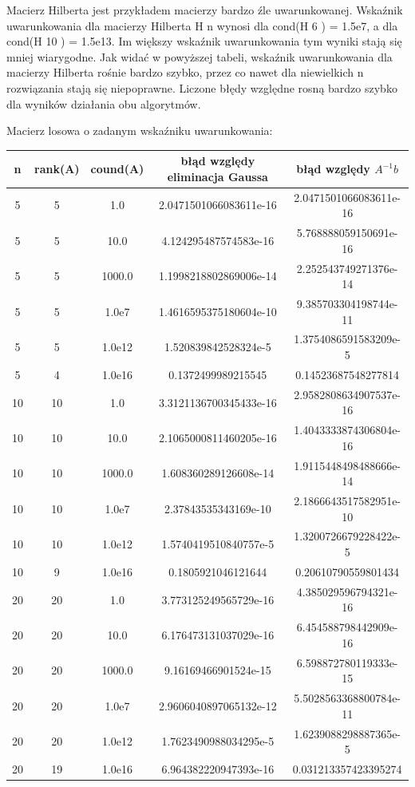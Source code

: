 \documentclass[8pt,letterpaper]{article}
\begin{document}
\hspace{1.0 cm}Macierz Hilberta jest przykładem macierzy bardzo źle uwarunkowanej. Wskaźnik uwarunkowania dla macierzy Hilberta H n wynosi dla cond(H 6 ) = 1.5e7, a dla cond(H 10 ) = 1.5e13. Im większy wskaźnik uwarunkowania tym wyniki stają się mniej wiarygodne. Jak widać w powyższej tabeli, wskaźnik uwarunkowania dla macierzy Hilberta rośnie bardzo szybko, przez co nawet dla niewielkich n rozwiązania stają się niepoprawne. Liczone błędy względne rosną bardzo szybko dla wyników działania obu algorytmów.



\begin{center}
Macierz losowa o zadanym wskaźniku uwarunkowania:
\\

\begin{tabular}{|c|c|c|c|c|}
                       
\hline
n & rank(A) & cound(A) & błąd względy eliminacja Gaussa & 	błąd względy $A^{-1}b$  \\
\hline
\hline
5 & 5 & 1.0 & 2.0471501066083611e-16 & 2.0471501066083611e-16 \\
5 & 5 & 10.0 & 4.124295487574583e-16 & 5.768888059150691e-16 \\
5 & 5 & 1000.0 & 1.1998218802869006e-14 & 2.252543749271376e-14 \\
5 & 5 & 1.0e7 & 1.4616595375180604e-10 & 9.385703304198744e-11 \\
5 & 5 & 1.0e12 & 1.520839842528324e-5 & 1.3754086591583209e-5 \\
5 & 4 & 1.0e16 & 0.1372499989215545 & 0.14523687548277814 \\
10 & 10 & 1.0 & 3.3121136700345433e-16 & 2.9582808634907537e-16 \\
10 & 10 & 10.0 & 2.1065000811460205e-16 & 1.4043333874306804e-16 \\
10 & 10 & 1000.0 & 1.608360289126608e-14 & 1.9115448498488666e-14 \\
10 & 10 & 1.0e7 & 2.37843535343169e-10 & 2.1866643517582951e-10 \\
10 & 10 & 1.0e12 & 1.5740419510840757e-5 & 1.3200726679228422e-5 \\
10 & 9 & 1.0e16 & 0.1805921046121644 & 0.20610790559801434 \\
20 & 20 & 1.0 & 3.773125249565729e-16 & 4.385029596794321e-16 \\
20 & 20 & 10.0 & 6.176473131037029e-16 & 6.454588798442909e-16 \\
20 & 20 & 1000.0 & 9.16169466901524e-15 & 6.598872780119333e-15 \\
20 & 20 & 1.0e7 & 2.9606040897065132e-12 & 5.5028563368800784e-11 \\
20 & 20 & 1.0e12 & 1.7623490988034295e-5 & 1.6239088298887365e-5 \\
20 & 19 & 1.0e16 & 6.964382220947393e-16 & 0.031213357423395274 \\
\hline
\end{tabular}
\end{center}
\end{document}
